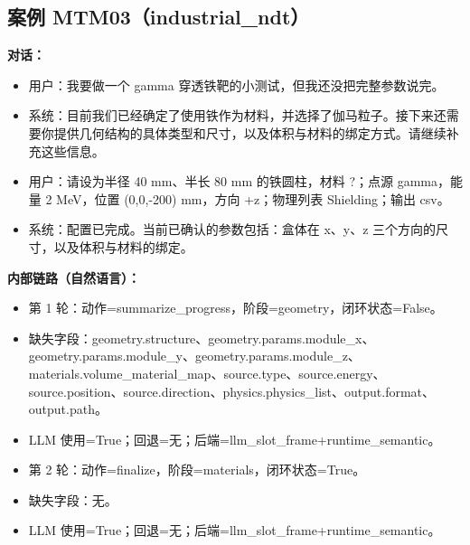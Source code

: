 \documentclass[11pt]{ctexart}
\begin{document}
\subsection{案例 MTM03（industrial\_ndt）}
\textbf{对话：}
\begin{itemize}
\item 用户：我要做一个 gamma 穿透铁靶的小测试，但我还没把完整参数说完。
\item 系统：目前我们已经确定了使用铁作为材料，并选择了伽马粒子。接下来还需要你提供几何结构的具体类型和尺寸，以及体积与材料的绑定方式。请继续补充这些信息。
\item 用户：请设为半径 40 mm、半长 80 mm 的铁圆柱，材料 ?；点源 gamma，能量 2 MeV，位置 (0,0,-200) mm，方向 +z；物理列表 Shielding；输出 csv。
\item 系统：配置已完成。当前已确认的参数包括：盒体在 x、y、z 三个方向的尺寸，以及体积与材料的绑定。
\end{itemize}
\textbf{内部链路（自然语言）：}
\begin{itemize}
\item 第 1 轮：动作=summarize\_progress，阶段=geometry，闭环状态=False。
\item 缺失字段：geometry.structure、geometry.params.module\_x、geometry.params.module\_y、geometry.params.module\_z、materials.volume\_material\_map、source.type、source.energy、source.position、source.direction、physics.physics\_list、output.format、output.path。
\item LLM 使用=True；回退=无；后端=llm\_slot\_frame+runtime\_semantic。
\item 第 2 轮：动作=finalize，阶段=materials，闭环状态=True。
\item 缺失字段：无。
\item LLM 使用=True；回退=无；后端=llm\_slot\_frame+runtime\_semantic。
\end{itemize}
\end{document}
